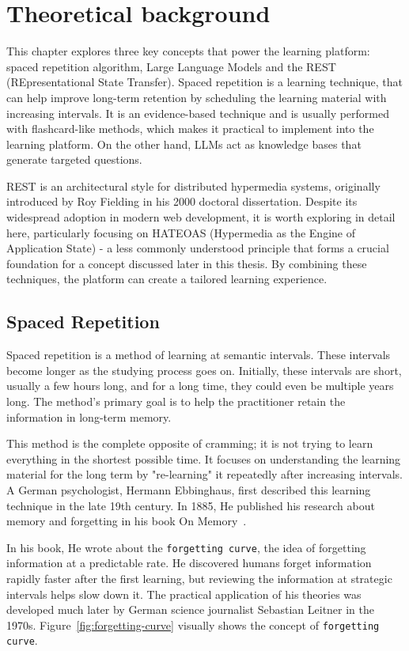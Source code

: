 \chapter{Theoretical background}

This chapter explores three key concepts that power the learning platform: spaced repetition algorithm, Large Language Models and the REST (REpresentational State Transfer). Spaced repetition is a learning technique, that can help improve long-term retention by scheduling the learning material with increasing intervals. It is an evidence-based technique and is usually performed with flashcard-like methods, which makes it practical to implement into the learning platform. On the other hand, LLMs act as knowledge bases that generate targeted questions.

REST is an architectural style for distributed hypermedia systems, originally introduced by Roy Fielding \cite{fielding2000} in his 2000 doctoral dissertation. Despite its widespread adoption in modern web development, it is worth exploring in detail here, particularly focusing on HATEOAS (Hypermedia as the Engine of Application State) - a less commonly understood principle that forms a crucial foundation for a concept discussed later in this thesis. By combining these techniques, the platform can create a tailored learning experience.

\section{Spaced Repetition}

Spaced repetition is a method of learning at semantic intervals. These intervals become longer as the studying process goes on. Initially, these intervals are short, usually a few hours long, and for a long time, they could even be multiple years long. The method's primary goal is to help the practitioner retain the information in long-term memory.

This method is the complete opposite of cramming; it is not trying to learn everything in the shortest possible time. It focuses on understanding the learning material for the long term by "re-learning" it repeatedly after increasing intervals. A German psychologist, Hermann Ebbinghaus, first described this learning technique in the late 19th century. In 1885, He published his research about memory and forgetting in his book On Memory~\cite{ebbinghaus1964memory}.

In his book, He wrote about the \texttt{forgetting curve}, the idea of forgetting information at a predictable rate. He discovered humans forget information rapidly faster after the first learning, but reviewing the information at strategic intervals helps slow down it. The practical application of his theories was developed much later by German science journalist Sebastian Leitner in the 1970s. Figure~\ref{fig:forgetting-curve} visually shows the concept of \texttt{forgetting curve}.

